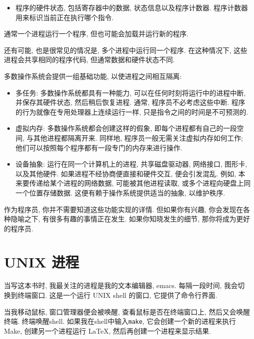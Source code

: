 \documentclass[12pt]{book}
\begin{document}
{\begin{itemize}
\item 程序的硬件状态, 包括寄存器中的数据, 状态信息以及程序计数器.
  程序计数器用来标识当前正在执行哪个指令.

\end{itemize}

通常一个进程运行一个程序, 但也可能会加载并运行新的程序.

还有可能, 也是很常见的情况是, 
多个进程中运行同一个程序. 在这种情况下, 这些进程会共享相同的程序代码,
但通常数据和硬件状态不同.

多数操作系统会提供一组基础功能, 以使进程之间相互隔离:

\begin{itemize}

\item 多任务: 多数操作系统都具有一种能力,
  可以在任何时刻将运行中的进程中断, 并保存其硬件状态,
  然后稍后恢复进程.
  通常, 程序员不必考虑这些中断.
  程序的行为就像在专用处理器上连续运行一样,
  只是指令之间的时间是不可预测的.

\item 虚拟内存: 多数操作系统都会创建这样的假象, 
  即每个进程都有自己的一段空间, 与其他进程都隔离开来.
  同样地, 程序员一般无需关注虚拟内存如何工作; 
  他们可以按照每个程序都有一段专门的内存来进行操作.

\item 设备抽象: 运行在同一个计算机上的进程, 共享磁盘驱动器, 网络接口, 
  图形卡, 以及其他硬件. 如果进程不经协商便直接和硬件交互, 便会引发混乱.
  例如, 本来要传递给某个进程的网络数据, 可能被其他进程读取, 
  或多个进程向硬盘上同一个位置存储数据.
  这便有赖于操作系统提供适当的抽象, 以维护秩序.

\end{itemize}

作为程序员, 你并不需要知道这些功能实现的详情.
但如果你有兴趣, 你会发现在各种隐喻之下, 
有很多有趣的事情正在发生.
如果你知晓发生的细节, 那你将成为更好的程序员.


\section{UNIX 进程}
\label{unixps}

当写这本书时, 我最关注的进程是我的文本编辑器, emacs.
每隔一段时间, 我会切换到终端窗口.
这是一个运行 UNIX shell 的窗口, 它提供了命令行界面.

当我移动鼠标, 窗口管理器便会被唤醒, 查看鼠标是否在终端窗口上,
然后又会唤醒终端. 终端唤醒shell. 
如果我在shell中输入{\tt make}, 
它会创建一个新的进程来执行 Make, 创建另一个进程运行 LaTeX,
然后再创建一个进程来显示结果.

}
\end{document}
